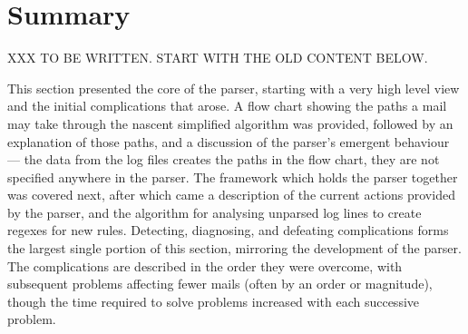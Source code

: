 \section{Summary}

XXX TO BE WRITTEN\@.  START WITH THE OLD CONTENT BELOW\@.

This section presented the core of the parser, starting with a very high
level view and the initial complications that arose.  A flow chart showing
the paths a mail may take through the nascent simplified algorithm was
provided, followed by an explanation of those paths, and a discussion of
the parser's emergent behaviour --- the data from the log files creates the
paths in the flow chart, they are not specified anywhere in the parser.
The framework which holds the parser together was covered next, after which
came a description of the current actions provided by the parser, and the
algorithm for analysing unparsed log lines to create regexes for new rules.
Detecting, diagnosing, and defeating complications forms the largest single
portion of this section, mirroring the development of the parser.  The
complications are described in the order they were overcome, with
subsequent problems affecting fewer mails (often by an order or magnitude),
though the time required to solve problems increased with each successive
problem.


